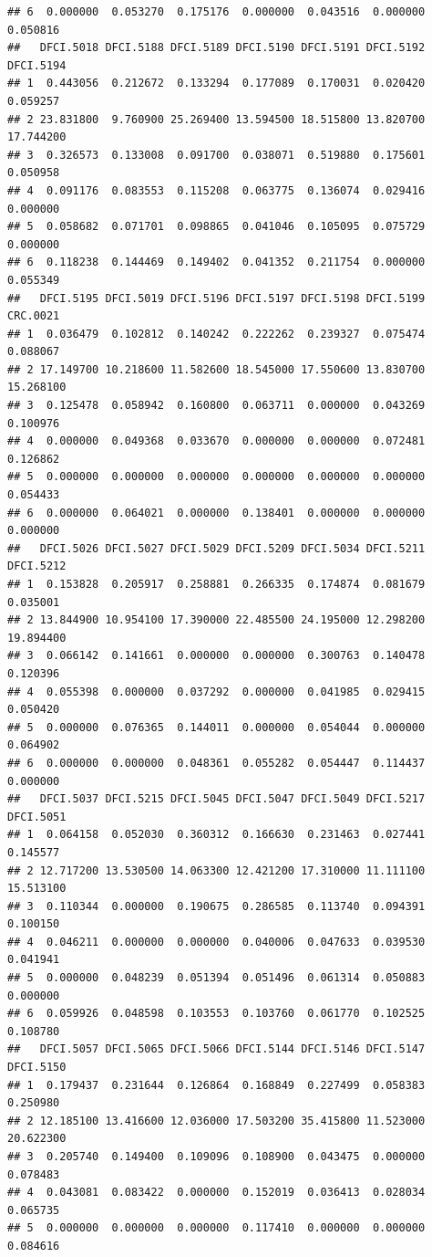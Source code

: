 \documentclass[
]{article}
\begin{document}
\begin{verbatim}
## 6  0.000000  0.053270  0.175176  0.000000  0.043516  0.000000  0.050816
##   DFCI.5018 DFCI.5188 DFCI.5189 DFCI.5190 DFCI.5191 DFCI.5192 DFCI.5194
## 1  0.443056  0.212672  0.133294  0.177089  0.170031  0.020420  0.059257
## 2 23.831800  9.760900 25.269400 13.594500 18.515800 13.820700 17.744200
## 3  0.326573  0.133008  0.091700  0.038071  0.519880  0.175601  0.050958
## 4  0.091176  0.083553  0.115208  0.063775  0.136074  0.029416  0.000000
## 5  0.058682  0.071701  0.098865  0.041046  0.105095  0.075729  0.000000
## 6  0.118238  0.144469  0.149402  0.041352  0.211754  0.000000  0.055349
##   DFCI.5195 DFCI.5019 DFCI.5196 DFCI.5197 DFCI.5198 DFCI.5199  CRC.0021
## 1  0.036479  0.102812  0.140242  0.222262  0.239327  0.075474  0.088067
## 2 17.149700 10.218600 11.582600 18.545000 17.550600 13.830700 15.268100
## 3  0.125478  0.058942  0.160800  0.063711  0.000000  0.043269  0.100976
## 4  0.000000  0.049368  0.033670  0.000000  0.000000  0.072481  0.126862
## 5  0.000000  0.000000  0.000000  0.000000  0.000000  0.000000  0.054433
## 6  0.000000  0.064021  0.000000  0.138401  0.000000  0.000000  0.000000
##   DFCI.5026 DFCI.5027 DFCI.5029 DFCI.5209 DFCI.5034 DFCI.5211 DFCI.5212
## 1  0.153828  0.205917  0.258881  0.266335  0.174874  0.081679  0.035001
## 2 13.844900 10.954100 17.390000 22.485500 24.195000 12.298200 19.894400
## 3  0.066142  0.141661  0.000000  0.000000  0.300763  0.140478  0.120396
## 4  0.055398  0.000000  0.037292  0.000000  0.041985  0.029415  0.050420
## 5  0.000000  0.076365  0.144011  0.000000  0.054044  0.000000  0.064902
## 6  0.000000  0.000000  0.048361  0.055282  0.054447  0.114437  0.000000
##   DFCI.5037 DFCI.5215 DFCI.5045 DFCI.5047 DFCI.5049 DFCI.5217 DFCI.5051
## 1  0.064158  0.052030  0.360312  0.166630  0.231463  0.027441  0.145577
## 2 12.717200 13.530500 14.063300 12.421200 17.310000 11.111100 15.513100
## 3  0.110344  0.000000  0.190675  0.286585  0.113740  0.094391  0.100150
## 4  0.046211  0.000000  0.000000  0.040006  0.047633  0.039530  0.041941
## 5  0.000000  0.048239  0.051394  0.051496  0.061314  0.050883  0.000000
## 6  0.059926  0.048598  0.103553  0.103760  0.061770  0.102525  0.108780
##   DFCI.5057 DFCI.5065 DFCI.5066 DFCI.5144 DFCI.5146 DFCI.5147 DFCI.5150
## 1  0.179437  0.231644  0.126864  0.168849  0.227499  0.058383  0.250980
## 2 12.185100 13.416600 12.036000 17.503200 35.415800 11.523000 20.622300
## 3  0.205740  0.149400  0.109096  0.108900  0.043475  0.000000  0.078483
## 4  0.043081  0.083422  0.000000  0.152019  0.036413  0.028034  0.065735
## 5  0.000000  0.000000  0.000000  0.117410  0.000000  0.000000  0.084616

\end{verbatim}
\end{document}
